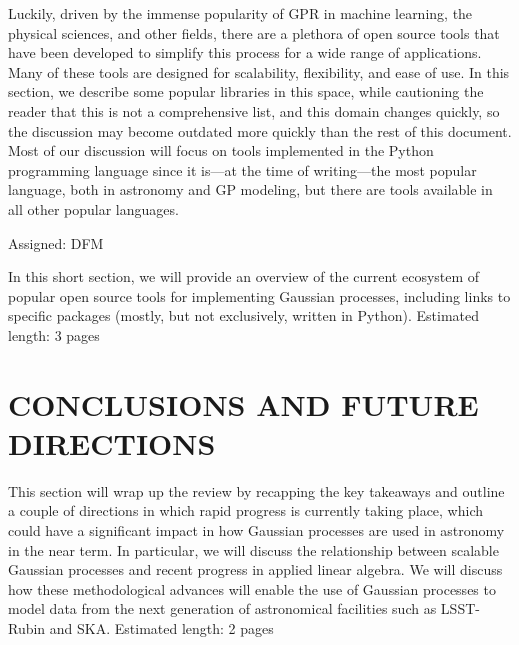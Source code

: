 \documentclass[letterpaper]{ar-1col}
\begin{document}
Luckily, driven by the immense popularity of GPR in machine learning, the physical sciences, and other fields, there are a plethora of open source tools that have been developed to simplify this process for a wide range of applications.
Many of these tools are designed for scalability, flexibility, and ease of use.
In this section, we describe some popular libraries in this space, while cautioning the reader that this is not a comprehensive list, and this domain changes quickly, so the discussion may become outdated more quickly than the rest of this document.
Most of our discussion will focus on tools implemented in the Python programming language since it is---at the time of writing---the most popular language, both in astronomy and GP modeling, but there are tools available in all other popular languages.

Assigned: DFM

In this short section, we will provide an overview of the current ecosystem of popular open source tools for implementing Gaussian processes, including links to specific packages (mostly, but not exclusively, written in Python). Estimated length: 3 pages

\section{CONCLUSIONS AND FUTURE DIRECTIONS}

This section will wrap up the review by recapping the key takeaways and outline a couple of directions in which rapid progress is currently taking place, which could have a significant impact in how Gaussian processes are used in astronomy in the near term. In particular, we will discuss the relationship between scalable Gaussian processes and recent progress in applied linear algebra. We will discuss how these methodological advances will enable the use of Gaussian processes to model data from the next generation of astronomical facilities such as LSST-Rubin and SKA. Estimated length: 2 pages

\end{document}
